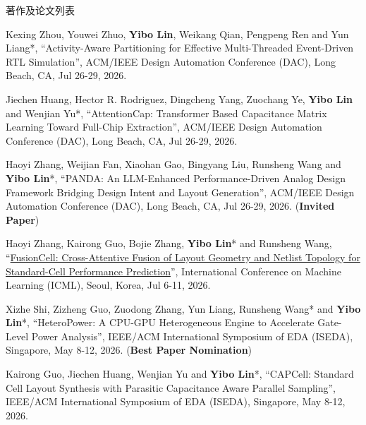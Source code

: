 \begin{rSection}{著作及论文列表}
\begin{description}[font=\normalfont, rightmargin=2em]
{}
            

\item[{[C231]}]{
        Kexing Zhou, Youwei Zhuo, \textbf{Yibo Lin}, Weikang Qian, Pengpeng Ren and Yun Liang*, 
    ``Activity-Aware Partitioning for Effective Multi-Threaded Event-Driven RTL Simulation'', 
    ACM/IEEE Design Automation Conference (DAC), Long Beach, CA, Jul 26-29, 2026.
    
}
            

\item[{[C230]}]{
        Jiechen Huang, Hector R. Rodriguez, Dingcheng Yang, Zuochang Ye, \textbf{Yibo Lin} and Wenjian Yu*, 
    ``AttentionCap: Transformer Based Capacitance Matrix Learning Toward Full-Chip Extraction'', 
    ACM/IEEE Design Automation Conference (DAC), Long Beach, CA, Jul 26-29, 2026.
    
}
            

\item[{[C229]}]{
        Haoyi Zhang, Weijian Fan, Xiaohan Gao, Bingyang Liu, Runsheng Wang and \textbf{Yibo Lin}*, 
    ``PANDA: An LLM-Enhanced Performance-Driven Analog Design Framework Bridging Design Intent and Layout Generation'', 
    ACM/IEEE Design Automation Conference (DAC), Long Beach, CA, Jul 26-29, 2026.
    (\textbf{Invited Paper})
}
            

\item[{[C228]}]{
        Haoyi Zhang, Kairong Guo, Bojie Zhang, \textbf{Yibo Lin}* and Runsheng Wang, 
    ``\href{https://openreview.net/pdf?id=os54CnlmbR}{FusionCell: Cross-Attentive Fusion of Layout Geometry and Netlist Topology for Standard-Cell Performance Prediction}'', 
    International Conference on Machine Learning (ICML), Seoul, Korea, Jul 6-11, 2026.
    
}
            

\item[{[C227]}]{
        Xizhe Shi, Zizheng Guo, Zuodong Zhang, Yun Liang, Runsheng Wang* and \textbf{Yibo Lin}*, 
    ``HeteroPower: A CPU-GPU Heterogeneous Engine to Accelerate Gate-Level Power Analysis'', 
    IEEE/ACM International Symposium of EDA (ISEDA), Singapore, May 8-12, 2026.
    (\textbf{Best Paper Nomination})
}
            

\item[{[C226]}]{
        Kairong Guo, Jiechen Huang, Wenjian Yu and \textbf{Yibo Lin}*, 
    ``CAPCell: Standard Cell Layout Synthesis with Parasitic Capacitance Aware Parallel Sampling'', 
    IEEE/ACM International Symposium of EDA (ISEDA), Singapore, May 8-12, 2026.
    
}
\end{description}
\end{rSection}
